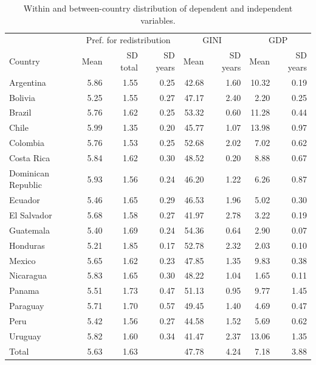 \documentclass[utf8]{frontiersSCNS} %
\begin{document}
\begin{table}[h]
\centering
	\caption{Within and between-country distribution of dependent and independent variables.}
	\label{appendix2}
    \renewcommand{\arraystretch}{0.8}
\begin{tabular}{lrrrrrrr}
  \toprule
	 & \multicolumn{3}{c}{Pref. for redistribution} & \multicolumn{2}{c}{GINI} & \multicolumn{2}{c}{GDP} \\
    Country & Mean & SD total & SD years & Mean & SD years & Mean & SD years \\
  \midrule
  Argentina & 5.86 & 1.55 & 0.25 & 42.68 & 1.60 & 10.32 & 0.19 \\
  Bolivia & 5.25 & 1.55 & 0.27 & 47.17 & 2.40 & 2.20 & 0.25 \\
  Brazil & 5.76 & 1.62 & 0.25 & 53.32 & 0.60 & 11.28 & 0.44 \\
  Chile & 5.99 & 1.35 & 0.20 & 45.77 & 1.07 & 13.98 & 0.97 \\
  Colombia & 5.76 & 1.53 & 0.25 & 52.68 & 2.02 & 7.02 & 0.62 \\
  Costa Rica & 5.84 & 1.62 & 0.30 & 48.52 & 0.20 & 8.88 & 0.67 \\
  Dominican Republic & 5.93 & 1.56 & 0.24 & 46.20 & 1.22 & 6.26 & 0.87 \\
  Ecuador & 5.46 & 1.65 & 0.29 & 46.53 & 1.96 & 5.02 & 0.30 \\
  El Salvador & 5.68 & 1.58 & 0.27 & 41.97 & 2.78 & 3.22 & 0.19 \\
  Guatemala & 5.40 & 1.69 & 0.24 & 54.36 & 0.64 & 2.90 & 0.07 \\
  Honduras & 5.21 & 1.85 & 0.17 & 52.78 & 2.32 & 2.03 & 0.10 \\
  Mexico & 5.65 & 1.62 & 0.23 & 47.85 & 1.35 & 9.83 & 0.38 \\
  Nicaragua & 5.83 & 1.65 & 0.30 & 48.22 & 1.04 & 1.65 & 0.11 \\
  Panama & 5.51 & 1.73 & 0.47 & 51.13 & 0.95 & 9.77 & 1.45 \\
  Paraguay & 5.71 & 1.70 & 0.57 & 49.45 & 1.40 & 4.69 & 0.47 \\
  Peru & 5.42 & 1.56 & 0.27 & 44.58 & 1.52 & 5.69 & 0.62 \\
  Uruguay & 5.82 & 1.60 & 0.34 & 41.47 & 2.37 & 13.06 & 1.35 \\
  Total & 5.63 & 1.63 &  & 47.78 & 4.24 & 7.18 & 3.88 \\
		\bottomrule
	\end{tabular}
\end{table}
\end{document}
